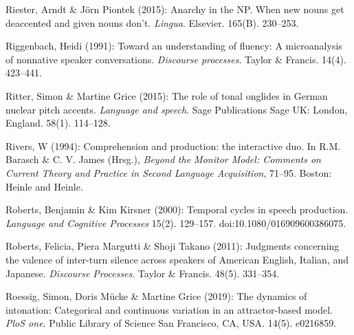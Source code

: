 \begin{styleBibliography}
Riester, Arndt \& Jörn Piontek (2015): Anarchy in the NP. When new nouns get deaccented and given nouns don’t. \textit{Lingua}. Elsevier. 165(B). 230–253.
\end{styleBibliography}

\begin{styleBibliography}
Riggenbach, Heidi (1991): Toward an understanding of fluency: A microanalysis of nonnative speaker conversations. \textit{Discourse processes}. Taylor \& Francis. 14(4). 423–441.
\end{styleBibliography}

\begin{styleBibliography}
Ritter, Simon \& Martine Grice (2015): The role of tonal onglides in German nuclear pitch accents. \textit{Language and speech}. Sage Publications Sage UK: London, England. 58(1). 114–128.
\end{styleBibliography}

\begin{styleBibliography}
Rivers, W (1994): Comprehension and production: the interactive duo. In R.M. Barasch \& C. V. James (Hrsg.), \textit{Beyond the Monitor Model: Comments on Current Theory and Practice in Second Language Acquisition}, 71–95. Boston: Heinle and Heinle.
\end{styleBibliography}

\begin{styleBibliography}
Roberts, Benjamin \& Kim Kirsner (2000): Temporal cycles in speech production. \textit{Language and Cognitive Processes} 15(2). 129–157. doi:10.1080/016909600386075.
\end{styleBibliography}

\begin{styleBibliography}
Roberts, Felicia, Piera Margutti \& Shoji Takano (2011): Judgments concerning the valence of inter-turn silence across speakers of American English, Italian, and Japanese. \textit{Discourse Processes}. Taylor \& Francis. 48(5). 331–354.
\end{styleBibliography}

\begin{styleBibliography}
Roessig, Simon, Doris Mücke \& Martine Grice (2019): The dynamics of intonation: Categorical and continuous variation in an attractor-based model. \textit{PloS one}. Public Library of Science San Francisco, CA, USA. 14(5). e0216859.
\end{styleBibliography}

